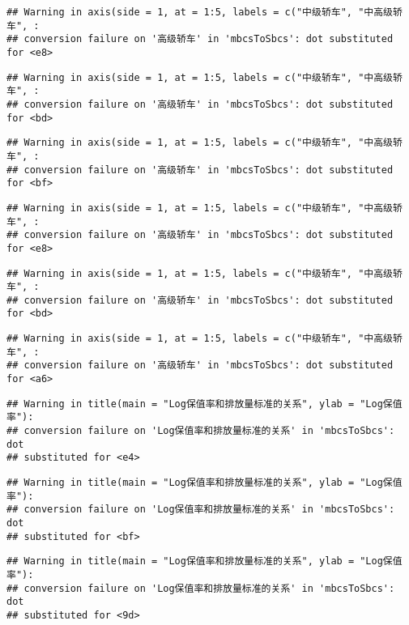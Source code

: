 \documentclass[]{article}
\begin{document}
\begin{verbatim}
## Warning in axis(side = 1, at = 1:5, labels = c("中级轿车", "中高级轿车", :
## conversion failure on '高级轿车' in 'mbcsToSbcs': dot substituted for <e8>
\end{verbatim}

\begin{verbatim}
## Warning in axis(side = 1, at = 1:5, labels = c("中级轿车", "中高级轿车", :
## conversion failure on '高级轿车' in 'mbcsToSbcs': dot substituted for <bd>
\end{verbatim}

\begin{verbatim}
## Warning in axis(side = 1, at = 1:5, labels = c("中级轿车", "中高级轿车", :
## conversion failure on '高级轿车' in 'mbcsToSbcs': dot substituted for <bf>
\end{verbatim}

\begin{verbatim}
## Warning in axis(side = 1, at = 1:5, labels = c("中级轿车", "中高级轿车", :
## conversion failure on '高级轿车' in 'mbcsToSbcs': dot substituted for <e8>
\end{verbatim}

\begin{verbatim}
## Warning in axis(side = 1, at = 1:5, labels = c("中级轿车", "中高级轿车", :
## conversion failure on '高级轿车' in 'mbcsToSbcs': dot substituted for <bd>
\end{verbatim}

\begin{verbatim}
## Warning in axis(side = 1, at = 1:5, labels = c("中级轿车", "中高级轿车", :
## conversion failure on '高级轿车' in 'mbcsToSbcs': dot substituted for <a6>
\end{verbatim}

\begin{verbatim}
## Warning in title(main = "Log保值率和排放量标准的关系", ylab = "Log保值率"):
## conversion failure on 'Log保值率和排放量标准的关系' in 'mbcsToSbcs': dot
## substituted for <e4>
\end{verbatim}

\begin{verbatim}
## Warning in title(main = "Log保值率和排放量标准的关系", ylab = "Log保值率"):
## conversion failure on 'Log保值率和排放量标准的关系' in 'mbcsToSbcs': dot
## substituted for <bf>
\end{verbatim}

\begin{verbatim}
## Warning in title(main = "Log保值率和排放量标准的关系", ylab = "Log保值率"):
## conversion failure on 'Log保值率和排放量标准的关系' in 'mbcsToSbcs': dot
## substituted for <9d>
\end{verbatim}
\end{document}
